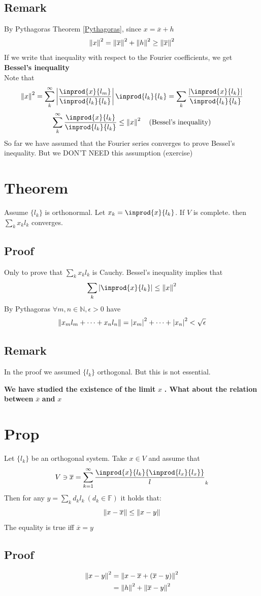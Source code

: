 \documentclass{book}
\newcommand{\abs}[1]{\left\lvert #1 \right\rvert}
\begin{document}
\subsection*{Remark}
By Pythagoras Theorem \ref{Pythagoras}, since $x=\overline{x}+h$
$$\left\lVert x \right\rVert^2=\left\lVert \overline{x} \right\rVert^2+\left\lVert h \right\rVert^2\geq\left\lVert \overline{x} \right\rVert^2$$
If we write that inequality with respect to the Fourier coefficients, we get \textbf{Bessel's inequality}\\Note that
$$\norm{x}^2=\sum\limits_k^\infty\abs{\frac{\inprod{x}{l_m}}{\inprod{l_k}{l_k}}}\inprod{l_k}{l_k}=\sum\limits_k\frac{\abs{\inprod{x}{l_k}}}{\inprod{l_k}{l_k}}$$
$$\sum\limits_{k}^\infty\frac{\inprod{x}{l_k}}{\inprod{l_k}{l_k}}\leq\norm{x}^2\quad(\text{Bessel's inequality})
$$
So far we have assumed that the Fourier series converges to prove Bessel's inequality. But we DON'T NEED this assumption (exercise)
\section{Theorem}
Assume $\{l_k\}$ is orthonormal. Let $x_k=\inprod{x}{l_k}$. If $V$ is complete. then $\sum\limits_{k}x_kl_k$ converges.
\subsection*{Proof}
Only to prove that $\sum\limits_kx_kl_k$ is Cauchy. Bessel's inequality implies that $$\sum\limits_k\abs{\inprod{x}{l_k}}\leq\norm{x}^2$$
By Pythagoras $\forall m,n \in \mathbb{N},\epsilon>0$ have
$$\norm{x_ml_m+\cdots+x_nl_n}=\abs{x_m}^2+\cdots+\abs{x_n}^2<\sqrt{\epsilon}$$
\subsection*{Remark}In the proof we assumed $\{l_k\}$ orthogonal. But this is not essential.

\textbf{We have studied the existence of the limit} $x$ \textbf{. What about the relation between } $\overline{x}$\textbf{ and }$x$
\section{Prop}\label{Prop 67.3}
Let $\{l_k\}$ be an orthogonal system. Take $x\in V$ and assume that
$$V\ni\overline{x}=\sum\limits_{k=1}^\infty
\frac{\inprod{x}{l_k}{\inprod{l_x}{l_x}}}l_k$$
Then for any $y=\sum\limits_{k}d_kl_k\ (d_k\in \mathbb{F})$ it holds that:
$$\left\lVert x-\overline{x} \right\rVert\leq\left\lVert x-y \right\rVert$$
The equality is true iff $\overline{x}=y$
\subsection*{Proof}
$$\begin{aligned}
    \left\lVert x-y \right\rVert^2 &=\left\lVert x-\overline{x}+(\overline x-y) \right\rVert^2\\
    &=\left\lVert h \right\rVert^2+\left\lVert \overline x-y \right\rVert^2
\end{aligned}$$
\end{document}
